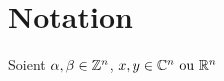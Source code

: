 
\chapter*{Notation}
Soient $\alpha, \beta \in \mathbb{Z}^n$, $ x,y \in \mathbb{C}^n \text{ ou }\mathbb{R}^n$ \\
\iffalse
$\ \ \ \  $\\
$\bullet\ \ \ \ \Cx  $:l'algèbre des séries convergentes.\\
$\bullet\ \ \ \ \Cfx  $:l'algèbre des séries formelles à coefficients dans $\C$.\\
$\bullet\ \ \ \ \  \displaystyle D^\alpha_x = \frac{\partial^{\alpha_1}}{\partial x_1^{\alpha_1}} \cdots \frac{\partial^{\alpha_n}}{\partial x_n^{\alpha_n}}$   \\
$\bullet\ \ \ \ \  \alpha=(\alpha_1,\cdots,\alpha_n)$ tel que $\alpha_i \in \Z,$ pour tout $i=0 \ldots n $\\
$\bullet\ \ \ \ \  |\alpha|=\alpha_1+\cdots + \alpha_n$\\
$\bullet\ \ \ \ \  \alpha!=\alpha_1!\cdots \alpha_n!$\\
$\bullet\ \ \ \ \  \alpha\pm \beta = (\alpha_1 \pm \beta_1,\cdots,\alpha_n \pm \beta_n)$ tel que $\alpha_i,\beta_i \in \Z$ pour tout $i=0 \ldots n $\\
$\bullet\ \ \ \ \ \alpha \neq \beta$ signifie $(\exists i, 0\leq i \leq n : \alpha_i \neq \beta_i$ )\\
$\bullet\ \ \ \ \ \alpha \leq \beta$ signifie $ \alpha_i \leq \beta_i$ pour tout $i=0 \ldots n $\\
$\bullet\ \ \ \ \ x^\alpha =x_1^{\alpha_1}\cdots x_n^{\alpha_n} $\\
$\bullet\ \ \ \ \  \|\cdot \|$: norme \\
$\bullet\ \ \ \ \ (xy)^k =\sum_{\begin{subarray}{c} |\alpha|=k \\ \alpha \in \Nn \end{subarray}} \frac{|\alpha|! x^\alpha y^\alpha}{\alpha!}$
\fi


